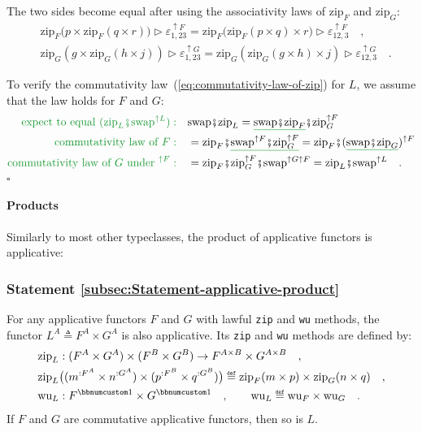 The two sides become equal after using the associativity laws of $\text{zip}_{F}$
and $\text{zip}_{G}$:
\begin{align*}
 & \text{zip}_{F}\big(p\times\text{zip}_{F}(q\times r)\big)\triangleright\varepsilon_{1,23}^{\uparrow F}=\text{zip}_{F}\big(\text{zip}_{F}(p\times q)\times r\big)\triangleright\varepsilon_{12,3}^{\uparrow F}\quad,\\
 & \text{zip}_{G}(g\times\text{zip}_{G}(h\times j))\triangleright\varepsilon_{1,23}^{\uparrow G}=\text{zip}_{G}(\text{zip}_{G}(g\times h)\times j)\triangleright\varepsilon_{12,3}^{\uparrow G}\quad.
\end{align*}

To verify the commutativity law~(\ref{eq:commutativity-law-of-zip})
for $L$, we assume that the law holds for $F$ and $G$:
\begin{align*}
{\color{greenunder}\text{expect to equal }(\text{zip}_{L}\bef\text{swap}^{\uparrow L}):}\quad & \text{swap}\bef\text{zip}_{L}=\gunderline{\text{swap}\bef\text{zip}_{F}}\bef\text{zip}_{G}^{\uparrow F}\\
{\color{greenunder}\text{commutativity law of }F:}\quad & =\text{zip}_{F}\bef\gunderline{\text{swap}^{\uparrow F}\bef\text{zip}_{G}^{\uparrow F}}=\text{zip}_{F}\bef(\gunderline{\text{swap}\bef\text{zip}_{G}})^{\uparrow F}\\
{\color{greenunder}\text{commutativity law of }G\text{ under }^{\uparrow F}:}\quad & =\text{zip}_{F}\bef\text{zip}_{G}^{\uparrow F}\bef\text{swap}^{\uparrow G\uparrow F}=\text{zip}_{L}\bef\text{swap}^{\uparrow L}\quad.
\end{align*}
$\square$

\paragraph{Products}

Similarly to most other typeclasses, the product of applicative functors
is applicative:

\subsubsection{Statement \label{subsec:Statement-applicative-product}\ref{subsec:Statement-applicative-product}}

For any applicative functors $F$ and $G$ with lawful \lstinline!zip!
and \lstinline!wu! methods, the functor $L^{A}\triangleq F^{A}\times G^{A}$
is also applicative. Its \lstinline!zip! and \lstinline!wu! methods
are defined by:
\begin{align*}
 & \text{zip}_{L}:(F^{A}\times G^{A})\times(F^{B}\times G^{B})\rightarrow F^{A\times B}\times G^{A\times B}\quad,\\
 & \text{zip}_{L}\big((m^{:F^{A}}\times n^{:G^{A}})\times(p^{:F^{B}}\times q^{:G^{B}})\big)\triangleq\text{zip}_{F}(m\times p)\times\text{zip}_{G}(n\times q)\quad,\\
 & \text{wu}_{L}:F^{\bbnum 1}\times G^{\bbnum 1}\quad,\quad\quad\text{wu}_{L}\triangleq\text{wu}_{F}\times\text{wu}_{G}\quad.
\end{align*}
If $F$ and $G$ are commutative applicative functors, then so is
$L$.

